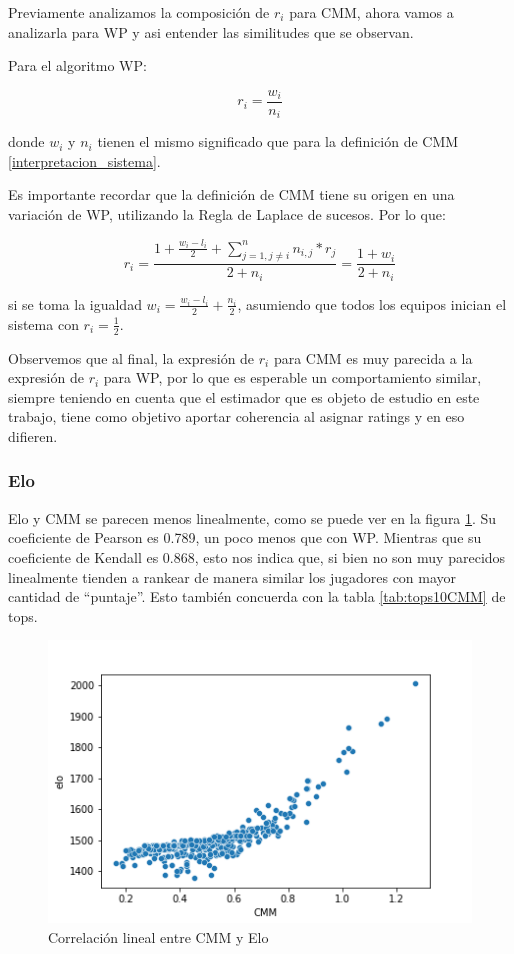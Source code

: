 Previamente analizamos la composición de $r_i$ para CMM, ahora vamos a analizarla para WP y asi entender las similitudes que se observan.

Para el algoritmo WP:

\begin{equation}
    r_i = \frac{w_i}{n_i}   
\end{equation}

donde $w_i$ y $n_i$ tienen el mismo significado que para la definición de CMM \ref{interpretacion_sistema}.

Es importante recordar que la definición de CMM tiene su origen en una variación de WP, utilizando la Regla de Laplace de sucesos. Por lo que:

\begin{equation}
    r_i = \frac{1 + \frac{w_i - l_i}{2} + \sum_{j=1, j \neq i}^{n}{n_{i,j} * r_j}}{2 + n_i} = \frac{1 + w_i}{2 + n_i}
\end{equation}

si se toma la igualdad $w_i = \frac{w_i - l_i}{2} + \frac{n_i}{2}$, asumiendo que todos los equipos inician el sistema con $r_i = \frac{1}{2}$.

Observemos que al final, la expresión de $r_i$ para CMM es muy parecida a la expresión de $r_i$ para WP, por lo que es esperable un comportamiento similar, siempre teniendo en cuenta que el estimador que es objeto de estudio en este trabajo, tiene como objetivo aportar coherencia al asignar ratings y en eso difieren.

\FloatBarrier
\subsubsection{Elo}

Elo y CMM se parecen menos linealmente, como se puede ver en la figura \ref{fig:sc_cmm_elo}. Su coeficiente de Pearson es 0.789, un poco menos que con WP. Mientras que su coeficiente de Kendall es 0.868, esto nos indica que, si bien no son muy parecidos linealmente tienden a rankear de manera similar los jugadores con mayor cantidad de ``puntaje''. Esto también concuerda con la tabla \ref{tab:tops10CMM} de tops.

\begin{figure}[h]
 \centering
 \includegraphics[scale=0.8]{imagenes/scatterplot_CMM_Elo.png}
 \caption{Correlación lineal entre CMM y Elo}
 \label{fig:sc_cmm_elo}
\end{figure}

